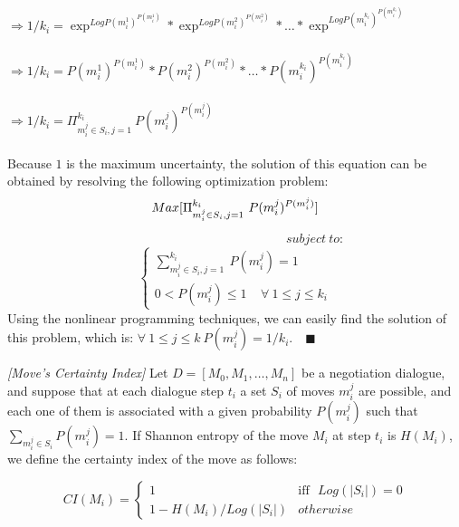 {\\ $\Rightarrow 1/{k_i} = \exp^{Log{P(m_i^1)^{P(m_i^1)}}}* \exp^{Log P(m_i^2)^{P(m_i^2)}}* \ldots * \exp^{Log P(m_i^{k_i})^{P(m_i^{k_i})}}$\\
\\ $\Rightarrow 1/{k_i} = {P(m_i^1)^{P(m_i^1)}}*{P(m_i^2)^{P(m_i^2)}}* \ldots * {P(m_i^{k_i})^{P(m_i^{k_i})}}$\\
\\ $\Rightarrow 1/{k_i} = \Pi_{m_i^j\in S_i, j=1}^{k_i}~{P(m_i^j)^{P(m_i^j)}}$ \\
\\Because $1$ is the maximum uncertainty, the solution of this equation can be obtained by resolving the following optimization problem:
%
\begin{equation*}
Max[\Pi_{m_i^j\in S_i, j=1}^{k_i}~{P(m_i^j)^{P(m_i^j)}}] \\
\end{equation*}
~~~~~~~~~~~~~~~~~~~~~~~~~~~~~~~~~~~~~~~~~~~~$subject~ to:$
%
\begin{equation*}
\begin{cases} \sum_{m_i^j\in S_i, j=1}^{k_i}~P(m_i^j)=1\\
0<P(m_i^j)\leq 1 ~~~~~ \forall ~1 \leq j \leq {k_i}
\end{cases}
\end{equation*}
%
Using the nonlinear programming techniques, we can easily find the solution of this  problem, which is:  $\forall ~1 \leq j \leq k ~
P(m_i^j)= 1/{k_i}$}.~~$\blacksquare$

\begin{definition}{\emph{[Move's Certainty Index]}} \label{Move'sCertainty}
Let $D=[M_0, M_1, \ldots, M_n]$ be a negotiation dialogue, and suppose that at each dialogue step $t_i$ a set $S_i$ of moves
$m_i^j$ are possible, and each one of them is associated with a given probability $P(m_i^j)$ such that $\sum_{m_i^j\in
S_i}P(m_i^j)=1$. If Shannon entropy of the move $M_i$ at step $t_i$ is $H(M_i)$, we define the certainty index of the move as
follows:

\begin{equation}\label{equation7}
CI(M_i)=
\begin{cases} 1 & \text{iff}~~~Log(|S_i|)=0
\\
1- H(M_i)/Log(|S_i|) &otherwise
\end{cases}
\end{equation}

\end{definition}

